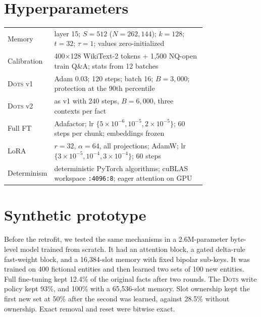 \documentclass[10pt]{article}
\newcommand{\sys}{\textsc{Dots}}
\begin{document}
\section{Hyperparameters}
\noindent\begin{tabular}{@{}lp{0.78\linewidth}@{}}
\toprule
Memory & layer 15; $S=512$ ($N=262{,}144$); $k=128$; $t=32$; $\tau=1$; values zero-initialized \\
Calibration & 400$\times$128 WikiText-2 tokens + 1{,}500 NQ-open train Q\&A; stats from 12 batches \\
\sys{} v1 & Adam 0.03; 120 steps; batch 16; $B=3{,}000$; protection at the 90th percentile \\
\sys{} v2 & as v1 with 240 steps, $B=6{,}000$, three contexts per fact \\
Full FT & Adafactor; lr $\{5\!\times\!10^{-6}, 10^{-5}, 2\!\times\!10^{-5}\}$; 60 steps per chunk; embeddings frozen \\
LoRA & $r=32$, $\alpha=64$, all projections; AdamW; lr $\{3\!\times\!10^{-5}, 10^{-4}, 3\!\times\!10^{-4}\}$; 60 steps \\
Determinism & deterministic PyTorch algorithms; cuBLAS workspace \texttt{:4096:8}; eager attention on GPU \\
\bottomrule
\end{tabular}

\section{Synthetic prototype}
\label{app:proto}
Before the retrofit, we tested the same mechanisms in a 2.6M-parameter byte-level model trained from scratch. It had an attention block, a gated delta-rule fast-weight block, and a 16{,}384-slot memory with fixed bipolar sub-keys. It was trained on 400 fictional entities and then learned two sets of 100 new entities. Full fine-tuning kept 12.4\% of the original facts after two rounds. The \sys{} write policy kept 93\%, and 100\% with a 65{,}536-slot memory. Slot ownership kept the first new set at 50\% after the second was learned, against 28.5\% without ownership. Exact removal and reset were bitwise exact.
\end{document}
